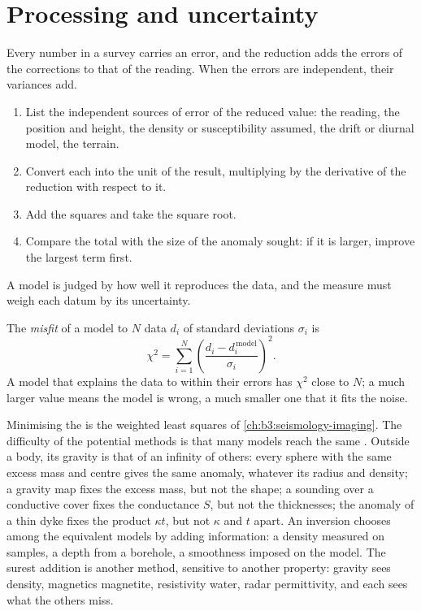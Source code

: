 \section{Processing and uncertainty}\label{sec:b3:field-lab-methods-3:processing}

Every number in a survey carries an error, and the reduction adds the
errors of the corrections to that of the reading. When the errors are
independent, their variances add.

\begin{method}\label{met:b3:field-lab-methods-3:budget}
\begin{enumerate}
  \item List the independent sources of error of the reduced value: the
        reading, the position and height, the density or susceptibility
        assumed, the drift or diurnal model, the terrain.
  \item Convert each into the unit of the result, multiplying by the
        derivative of the reduction with respect to it.
  \item Add the squares and take the square root.
  \item Compare the total with the size of the anomaly sought: if it is
        larger, improve the largest term first.
\end{enumerate}
\end{method}

A model is judged by how well it reproduces the data, and the measure
must weigh each datum by its uncertainty.

\begin{definition}\label{def:b3:field-lab-methods-3:inversion-practice}
The \emph{misfit} of a model to $N$ data $d_i$ of
standard deviations $\sigma_i$ is
\[
\chi^2 = \sum_{i=1}^N\left(\frac{d_i - d_i^{\,\mathrm{model}}}{\sigma_i}\right)^2 .
\]
A model that explains the data to within their errors has $\chi^2$ close
to $N$; a much larger value means the model is wrong, a much smaller one
that it fits the noise.
\end{definition}

Minimising the  is the weighted least squares of
\cref{ch:b3:seismology-imaging}. The difficulty of the potential
methods is that many models reach the same . Outside a body, its
gravity is that of an infinity of others: every sphere with the same
excess mass and centre gives the same anomaly, whatever its radius and
density; a gravity map fixes the excess mass, but not the shape; a
sounding over a conductive cover fixes the conductance $S$, but not the
thicknesses; the anomaly of a thin dyke fixes the product $\kappa t$,
but not $\kappa$ and $t$ apart. An inversion chooses among the
equivalent models by adding information: a density measured on samples,
a depth from a borehole, a smoothness imposed on the model. The surest
addition is another method, sensitive to another property: gravity sees
density, magnetics magnetite, resistivity water, radar permittivity, and
each sees what the others miss.

